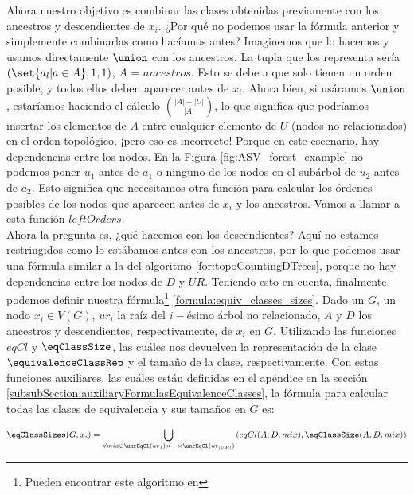Ahora nuestro objetivo es combinar las clases obtenidas previamente con los ancestros y descendientes de $x_i$. ¿Por qué no podemos usar la fórmula anterior y simplemente combinarlas como hacíamos antes? Imaginemos que lo hacemos y usamos directamente $\union$ con los ancestros. La tupla que los representa sería  $(\set{ a_l | a \in A}, 1, 1)$, $A$ = $ancestros$. Esto se debe a que solo tienen un orden posible, y todos ellos deben aparecer antes de $x_i$. Ahora bien, si usáramos $\union$, estaríamos haciendo el cálculo $\binom{|A| + |U|}{|A|}$, lo que significa que podríamos insertar los elementos de $A$ entre cualquier elemento de $U$ (nodos no relacionados) en el orden topológico, ¡pero eso es incorrecto! Porque en este escenario, hay dependencias entre los nodos. En la Figura \ref{fig:ASV_forest_example} no podemos poner $u_1$ antes de $a_1$ o ninguno de los nodos en el subárbol de $u_2$ antes de $a_2$. Esto significa que necesitamos otra función para calcular los órdenes posibles de los nodos que aparecen antes de $x_i$ y los ancestros. Vamos a llamar a esta función $leftOrders$. \\

Ahora la pregunta es, ¿qué hacemos con los descendientes? Aquí no estamos restringidos como lo estábamos antes con los ancestros, por lo que podemos usar una fórmula similar a la del algoritmo \ref{for:topoCountingDTrees}, porque no hay dependencias entre los nodos de $D$ y $UR$. Teniendo esto en cuenta, finalmente podemos definir nuestra fórmula\footnote{Pueden encontrar este algoritmo en } \ref{formula:equiv_classes_sizes}. Dado un \dtree{} $G$, un nodo $x_i \in V(G)$, $ur_i$ la raíz del $i-$ésimo árbol no relacionado, $A$ y $D$ los ancestros y descendientes, respectivamente, de $x_i$ en $G$. Utilizando las funciones $eqCl$ y $\eqClassSize$, las cuáles nos devuelven la representación de la clase $\equivalenceClassRep$ y el tamaño de la clase, respectivamente. Con estas funciones auxiliares, las cuáles están definidas en el apéndice en la sección \ref{subsubSection:auxiliaryFormulasEquivalenceClasses}, la fórmula para calcular todas las clases de equivalencia y sus tamaños en $G$ es:


\begin{align}\label{formula:equiv_classes_sizes}
    \eqClassSizes(G, x_i) = 
    \bigcup_{\forall mix \in \unrEqCl(ur_1) \times \dots \times \unrEqCl(ur_{|UR|})} \left( eqCl(A,D, mix) , \eqClassSize(A,D,mix) \right) 
\end{align}

